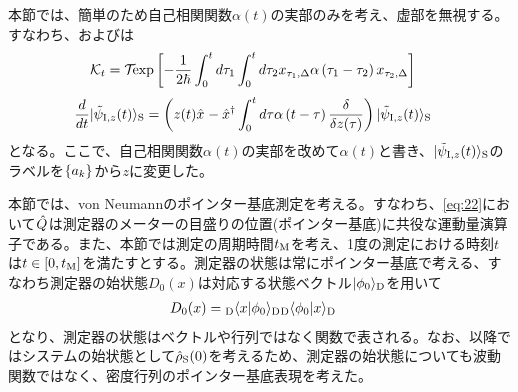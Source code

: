 \documentclass[10pt, a4paper]{jsarticle}
\begin{document}
本節では、簡単のため自己相関関数$\alpha \left( t \right)$の実部のみを考え、虚部を無視する。すなわち、およびは
\begin{equation}
\begin{split}
\label{eq:227}
	\sop{K}{t} &= \sop{T}{} \exp{- \dfrac{1}{2 \hbar} \integ{0}{t} d\tau_{1} \integ{0}{t} d\tau_{2}  x_{\tau_{1}, \Delta} \alpha \left(\tau_{1} - \tau_{2} \right) x_{\tau_{2}, \Delta}}
\end{split}
\end{equation}
\begin{equation}
\begin{split}
\label{eq:228}
	\dev{}{t}\ket{\tilde{\psi}_{{\rm I}, z}(t)}{S} &= \left( z(t) \op{x}{} - \dop{x}{} \integ{0}{t} d\tau \alpha \left( t - \tau \right) \fdev{}{z(\tau)} \right) \ket{\tilde{\psi}_{{\rm I}, z}(t)}{S}
\end{split}
\end{equation}
となる。ここで、自己相関関数$\alpha \left( t \right)$の実部を改めて$\alpha \left( t \right)$と書き、$| \tilde{\psi}_{{\rm I}, z}(t) \rangle_{\rm S}$のラベルを$\left\{ a_{k} \right\}_{}$から$z$に変更した。

本節では、von Neumannのポインター基底測定\cite{hotta2014quantum}を考える。すなわち、\ref{eq:22}において$\hat{Q}_{}$は測定器のメーターの目盛りの位置(ポインター基底)に共役な運動量演算子である。また、本節では測定の周期時間$t_{\rm M}$を考え、1度の測定における時刻$t$は$t \in \left[ 0, t_{\rm M} \right]$を満たすとする。測定器の状態は常にポインター基底で考える、すなわち測定器の始状態$D_{0}(x)$は対応する状態ベクトル$| \phi_{0} \rangle_{\rm D}$を用いて
\begin{equation}
\begin{split}
\label{eq:229}
	D_{0}(x) &= \inner{x}{D}{\phi_{0}}{D} \inner{\phi_{0}}{D}{x}{D}
\end{split}
\end{equation}
となり、測定器の状態はベクトルや行列ではなく関数で表される。なお、以降ではシステムの始状態として$\hat{\rho}_{\rm S}(0)$を考えるため、測定器の始状態についても波動関数ではなく、密度行列のポインター基底表現を考えた。
\end{document}
